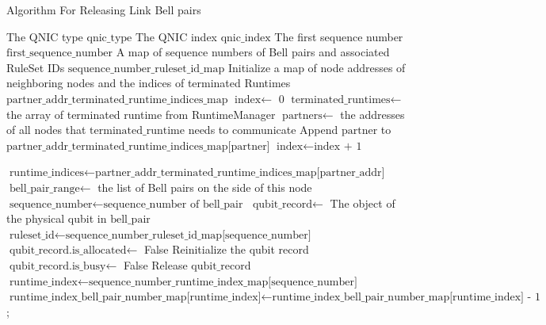\begin{algorithm}[H]  
  \begin{minipage}{0.8\linewidth}
  \caption{Algorithm For Releasing Link Bell pairs}                 
  \begin{algorithmic}[1]
    \Require The QNIC type $\text{qnic\_type}$
    \Require The QNIC index $\text{qnic\_index}$
    \Require The first sequence number $\text{first\_sequence\_number}$
    \Require A map of sequence numbers of Bell pairs and associated RuleSet IDs $\text{sequence\_number\_ruleset\_id\_map}$
    \State Initialize a map of node addresses of neighboring nodes and the indices of terminated Runtimes $\text{partner\_addr\_terminated\_runtime\_indices\_map}$
    \State $\text{index} \gets$ 0
    \State $\text{terminated\_runtimes} \gets$ the array of terminated runtime from RuntimeManager
      \State $\text{partners} \gets$ the addresses of all nodes that $\text{terminated\_runtime}$ needs to communicate
        \State Append $\text{partner}$ to $\text{partner\_addr\_terminated\_runtime\_indices\_map[partner]}$
      \EndFor
      \State $\text{index} \gets \text{index + 1}$
    \EndFor

      \State $\text{runtime\_indices} \gets \text{partner\_addr\_terminated\_runtime\_indices\_map[partner\_addr]}$
      \State $\text{bell\_pair\_range} \gets$ the list of Bell pairs on the side of this node
        \State $\text{sequence\_number} \gets \text{sequence\_number of bell\_pair}$
          \State $\text{qubit\_record} \gets$ The object of the physical qubit in $\text{bell\_pair}$
          \State $\text{ruleset\_id} \gets \text{sequence\_number\_ruleset\_id\_map[sequence\_number]}$
            \State $\text{qubit\_record.is\_allocated} \gets$ False
            \State Reinitialize the qubit record
                \State $\text{qubit\_record.is\_busy} \gets$ False
              \EndIf
                  \State Release $\text{qubit\_record}$ 
                  \State $\text{runtime\_index} \gets \text{sequence\_number\_runtime\_index\_map[sequence\_number]}$
                  \State $\text{runtime\_index\_bell\_pair\_number\_map[runtime\_index]} \gets \text{runtime\_index\_bell\_pair\_number\_map[runtime\_index] - 1}$;
                \EndIf
              \EndFor
            \EndIf
          \EndIf
      \EndFor
    \EndFor
  \end{algorithmic}
\end{minipage}
\end{algorithm}


